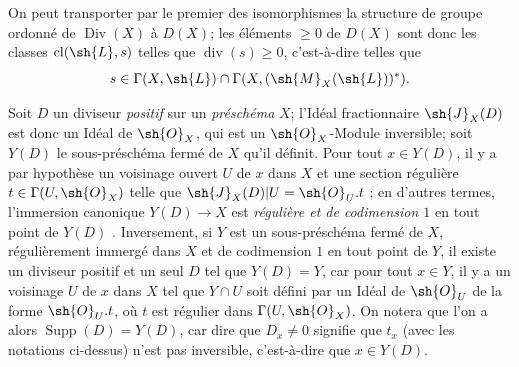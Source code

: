 On peut transporter par le premier des isomorphismes  la structure de groupe ordonné de $\operatorname{Div}(X)$ à $D(X)$;
les éléments $\geq0$ de $D(X)$ sont donc les classes $\operatorname{cl}(\sh{L},s)$ telles que $\operatorname{div}(s)\geq0$, c'est-à-dire  telles que
\[
  s\in\Gamma(X,\sh{L})\cap\Gamma(X,(\sh{M}_X(\sh{L}))^*).
\]

\begin{env}[21.2.12]
\label{IV.21.2.12}
Soit $D$ un diviseur \emph{positif} sur un \emph{préschéma} $X$;
l'Idéal fractionnaire $\sh{J}_X(D)$ est donc un Idéal de $\sh{O}_X$, qui est un $\sh{O}_X$-Module inversible;
soit $Y(D)$ le sous-préschéma fermé de $X$ qu'il définit.
Pour tout $x\in Y(D)$, il y a par hypothèse un voisinage ouvert $U$ de $x$ dans $X$ et une section régulière $t\in\Gamma(U,\sh{O}_X)$ telle que $\sh{J}_X(D)|U=\sh{O}_U.t$ ;
en d'autres termes, l'immersion canonique $Y(D)\to X$ est \emph{régulière et de codimension $1$} en tout point de $Y(D)$ .
Inversement, si $Y$ est un sous-préschéma fermé de $X$, régulièrement immergé dans $X$ et de codimension $1$ en tout point de $Y$, il existe un diviseur positif et un seul $D$ tel que $Y(D)=Y$, car pour tout $x\in Y$, il y a un voisinage $U$ de $x$ dans $X$ tel que $Y\cap U$ soit défini par un Idéal de $\sh{O}_U$ de la forme $\sh{O}_U.t$, où $t$ est régulier dans $\Gamma(U,\sh{O}_X)$.
On notera que l'on a alors $\operatorname{Supp}(D)=Y(D)$, car dire que $D_x\neq0$ signifie que $t_x$ (avec les notations ci-dessus) n'est pas inversible, c'est-à-dire que $x\in Y(D)$.
\end{env}

